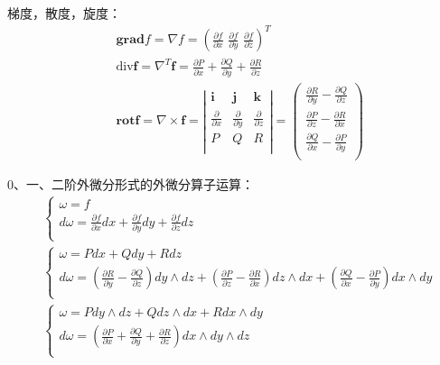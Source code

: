 梯度，散度，旋度：
\begin{align*}
&\mathbf{grad}f=\nabla f=\left( \frac{\partial f}{\partial x}\,\,\frac{\partial f}{\partial y}\,\,\frac{\partial f}{\partial z} \right) ^T \\
&\mathrm{div}\boldsymbol{f}=\nabla ^T\boldsymbol{f}=\frac{\partial P}{\partial x}+\frac{\partial Q}{\partial y}+\frac{\partial R}{\partial z} \\
&\mathbf{rot}\boldsymbol{f}=\nabla \times \boldsymbol{f}=\left| \begin{matrix}
	\mathbf{i}&		\mathbf{j}&		\mathbf{k}\\
	\frac{\partial}{\partial x}&		\frac{\partial}{\partial y}&		\frac{\partial}{\partial z}\\
	P&		Q&		R\\
\end{matrix} \right|=\left( \begin{array}{c}
	\frac{\partial R}{\partial y}-\frac{\partial Q}{\partial z}\\
	\frac{\partial P}{\partial z}-\frac{\partial R}{\partial x}\\
	\frac{\partial Q}{\partial x}-\frac{\partial P}{\partial y}\\
\end{array} \right)
\end{align*}

0、一、二阶外微分形式的外微分算子运算：
\begin{align*}
&\begin{cases}
	\omega =f\\
	d\omega =\frac{\partial f}{\partial x}dx+\frac{\partial f}{\partial y}dy+\frac{\partial f}{\partial z}dz\\
\end{cases} \\
&\begin{cases}
	\omega =Pdx+Qdy+Rdz\\
	d\omega =\left( \frac{\partial R}{\partial y}-\frac{\partial Q}{\partial z} \right) dy\land dz+\left( \frac{\partial P}{\partial z}-\frac{\partial R}{\partial x} \right) dz\land dx+\left( \frac{\partial Q}{\partial x}-\frac{\partial P}{\partial y} \right) dx\land dy\\
\end{cases} \\
&\begin{cases}
	\omega =Pdy\land dz+Qdz\land dx+Rdx\land dy\\
	d\omega =\left( \frac{\partial P}{\partial x}+\frac{\partial Q}{\partial y}+\frac{\partial R}{\partial z} \right) dx\land dy\land dz\\
\end{cases}
\end{align*}

